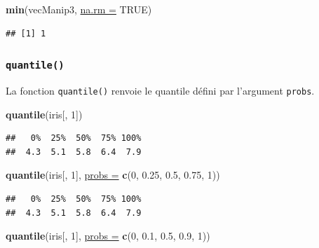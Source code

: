 \documentclass[twoside,symmetric]{book}
\newenvironment{Shaded}{}{}
\newcommand{\DataTypeTok}[1]{\underline{#1}}
\newcommand{\DecValTok}[1]{#1}
\newcommand{\FloatTok}[1]{#1}
\newcommand{\KeywordTok}[1]{\textbf{#1}}
\newcommand{\NormalTok}[1]{#1}
\newcommand{\OtherTok}[1]{#1}
\begin{document}
\begin{Shaded}
\begin{Highlighting}[]
\KeywordTok{min}\NormalTok{(vecManip3, }\DataTypeTok{na.rm =} \OtherTok{TRUE}\NormalTok{)}
\end{Highlighting}
\end{Shaded}

\begin{verbatim}
## [1] 1
\end{verbatim}

\hypertarget{l015quantile}{%
\subsubsection{\texorpdfstring{\texttt{quantile()}}{quantile()}}\label{l015quantile}}

La fonction \texttt{quantile()} renvoie le quantile défini par l'argument \texttt{probs}.

\begin{Shaded}
\begin{Highlighting}[]
\KeywordTok{quantile}\NormalTok{(iris[, }\DecValTok{1}\NormalTok{])}
\end{Highlighting}
\end{Shaded}

\begin{verbatim}
##   0%  25%  50%  75% 100% 
##  4.3  5.1  5.8  6.4  7.9
\end{verbatim}

\begin{Shaded}
\begin{Highlighting}[]
\KeywordTok{quantile}\NormalTok{(iris[, }\DecValTok{1}\NormalTok{], }\DataTypeTok{probs =} \KeywordTok{c}\NormalTok{(}\DecValTok{0}\NormalTok{, }\FloatTok{0.25}\NormalTok{, }\FloatTok{0.5}\NormalTok{, }\FloatTok{0.75}\NormalTok{, }\DecValTok{1}\NormalTok{))}
\end{Highlighting}
\end{Shaded}

\begin{verbatim}
##   0%  25%  50%  75% 100% 
##  4.3  5.1  5.8  6.4  7.9
\end{verbatim}

\begin{Shaded}
\begin{Highlighting}[]
\KeywordTok{quantile}\NormalTok{(iris[, }\DecValTok{1}\NormalTok{], }\DataTypeTok{probs =} \KeywordTok{c}\NormalTok{(}\DecValTok{0}\NormalTok{, }\FloatTok{0.1}\NormalTok{, }\FloatTok{0.5}\NormalTok{, }\FloatTok{0.9}\NormalTok{, }\DecValTok{1}\NormalTok{))}
\end{Highlighting}
\end{Shaded}
\end{document}
